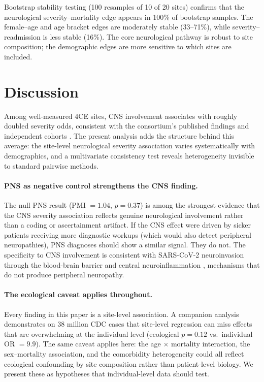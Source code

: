 \documentclass{article}
\begin{document}
Bootstrap stability testing (100 resamples of 10 of 20 sites) confirms that the neurological severity--mortality edge appears in 100\% of bootstrap samples.
The female--age and age bracket edges are moderately stable (33--71\%), while severity--readmission is less stable (16\%).
The core neurological pathway is robust to site composition; the demographic edges are more sensitive to which sites are included.


\section{Discussion}

Among well-measured 4CE sites, CNS involvement associates with roughly doubled severity odds, consistent with the consortium's published findings \cite{four_ce_neuro2021} and independent cohorts \cite{frontera2021neuro, mao2020neuro}.
The present analysis adds the structure behind this average: the site-level neurological severity association varies systematically with demographics, and a multivariate consistency test reveals heterogeneity invisible to standard pairwise methods.

\paragraph{PNS as negative control strengthens the CNS finding.}
The null PNS result (PMI $= 1.04$, $p = 0.37$) is among the strongest evidence that the CNS severity association reflects genuine neurological involvement rather than a coding or ascertainment artifact.
If the CNS effect were driven by sicker patients receiving more diagnostic workups (which would also detect peripheral neuropathies), PNS diagnoses should show a similar signal.
They do not.
The specificity to CNS involvement is consistent with SARS-CoV-2 neuroinvasion through the blood-brain barrier \cite{song2021neuroinvasion} and central neuroinflammation \cite{iadecola2020covid}, mechanisms that do not produce peripheral neuropathy.

\paragraph{The ecological caveat applies throughout.}
Every finding in this paper is a site-level association.
A companion analysis~\cite{tower2025averages} demonstrates on 38 million CDC cases that site-level regression can miss effects that are overwhelming at the individual level (ecological $p = 0.12$ vs.\ individual OR $= 9.9$).
The same caveat applies here: the age $\times$ mortality interaction, the sex--mortality association, and the comorbidity heterogeneity could all reflect ecological confounding by site composition rather than patient-level biology.
We present these as hypotheses that individual-level data should test.
\end{document}
